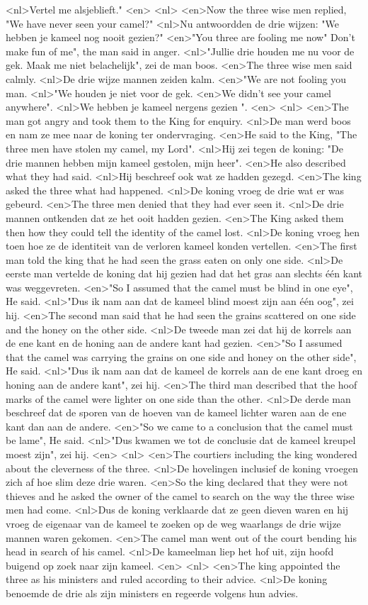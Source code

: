 <nl>Vertel me alsjeblieft."
<en>
<nl>
<en>Now the three wise men replied, "We have never seen your camel?"
<nl>Nu antwoordden de drie wijzen: "We hebben je kameel nog nooit gezien?"
<en>"You three are fooling me now" Don’t make fun of me", the man said in anger.
<nl>"Jullie drie houden me nu voor de gek. Maak me  niet belachelijk", zei de man boos.
<en>The three wise men said calmly.
<nl>De drie wijze mannen zeiden kalm. 
<en>"We are not fooling you man.
<nl>"We houden je niet voor de gek.
<en>We didn’t see your camel anywhere".
<nl>We hebben je kameel nergens gezien ".
<en>
<nl>
<en>The man got angry and took them to the King for enquiry.
<nl>De man werd boos en nam ze mee naar de koning ter ondervraging.
<en>He said to the King, "The three men have stolen my camel, my Lord".
<nl>Hij zei tegen de koning: "De drie mannen hebben mijn kameel gestolen, mijn heer".
<en>He also described what they had said.
<nl>Hij beschreef ook wat ze hadden gezegd.
<en>The king asked the three what had happened.
<nl>De koning vroeg de drie wat er was gebeurd.
<en>The three men denied that they had ever seen it.
<nl>De drie mannen ontkenden dat ze het ooit hadden gezien.
<en>The King asked them then how they could tell the identity of the camel lost.
<nl>De koning vroeg hen toen hoe ze de identiteit van de verloren kameel konden vertellen.
<en>The first man told the king that he had seen the grass eaten on only one side.
<nl>De eerste man vertelde de koning dat hij gezien had dat het gras aan slechts één kant was weggevreten.
<en>"So I assumed that the camel must be blind in one eye", He said.
<nl>"Dus ik nam aan dat de kameel blind moest zijn aan één oog", zei hij.
<en>The second man said that he had seen the grains scattered on one side and the honey on the other side.
<nl>De tweede man zei dat hij de korrels aan de ene kant en de honing aan de andere kant had gezien.
<en>"So I assumed that the camel was carrying the grains on one side and honey on the other side", He said.
<nl>"Dus ik nam aan dat de kameel de korrels aan de ene kant droeg en honing aan de andere kant", zei hij.
<en>The third man described that the hoof marks of the camel were lighter on one side than the other.
<nl>De derde man beschreef dat de sporen van de hoeven van de kameel lichter waren aan de ene kant dan aan de andere.
<en>"So we came to a conclusion that the camel must be lame", He said.
<nl>"Dus kwamen we tot de conclusie dat de kameel kreupel moest zijn", zei hij.
<en>
<nl>
<en>The courtiers including the king wondered about the cleverness of the three.
<nl>De hovelingen inclusief de koning vroegen zich af hoe slim deze drie waren.
<en>So the king declared that they were not thieves and he asked the owner of the camel to search on the way the three wise men had come.
<nl>Dus de koning verklaarde dat ze geen dieven waren en hij vroeg de eigenaar van de kameel te zoeken op de weg  waarlangs de drie wijze mannen waren gekomen.
<en>The camel man went out of the court bending his head in search of his camel.
<nl>De kameelman liep het hof uit,  zijn hoofd buigend op zoek naar zijn kameel.
<en>
<nl>
<en>The king appointed the three as his ministers and ruled according to their advice.
<nl>De koning benoemde de drie als zijn ministers en regeerde volgens hun advies.
